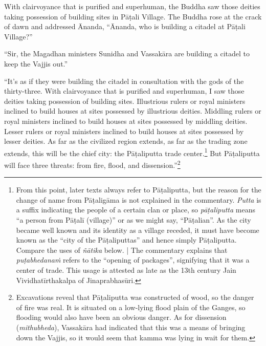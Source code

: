 \documentclass[12pt,openany]{book}%
\begin{document}
With clairvoyance that is purified and superhuman, the Buddha saw those deities taking possession of building sites in \textsanskrit{Pāṭali} Village. The Buddha rose at the crack of dawn and addressed Ānanda, “Ānanda, who is building a citadel at \textsanskrit{Pāṭali} Village?” 

“Sir, the Magadhan ministers Sunidha and \textsanskrit{Vassakāra} are building a citadel to keep the Vajjis out.” 

“It’s as if they were building the citadel in consultation with the gods of the thirty-three. With clairvoyance that is purified and superhuman, I saw those deities taking possession of building sites. Illustrious rulers or royal ministers inclined to build houses at sites possessed by illustrious deities. Middling rulers or royal ministers inclined to build houses at sites possessed by middling deities. Lesser rulers or royal ministers inclined to build houses at sites possessed by lesser deities. As far as the civilized region extends, as far as the trading zone extends, this will be the chief city: the \textsanskrit{Pāṭaliputta} trade center.\footnote{From this point, later texts always refer to \textsanskrit{Pāṭaliputta}, but the reason for the change of name from \textsanskrit{Pāṭaligāma} is not explained in the commentary. \textit{Putta} is a suffix indicating the people of a certain clan or place, so \textit{\textsanskrit{pāṭaliputta}} means “a person from \textsanskrit{Pāṭalī} (village)” or as we might say, “\textsanskrit{Pāṭalian}”. As the city became well known and its identity as a village receded, it must have become known as the “city of the \textsanskrit{Pāṭaliputtas}” and hence simply \textsanskrit{Pāṭaliputta}. Compare the uses of \textit{\textsanskrit{ñātika}} below. | The commentary explains that \textit{\textsanskrit{puṭabhedanaṁ}} refers to the “opening of packages”, signifying that it was a center of trade. This usage is attested as late as the 13th century Jain \textsanskrit{Vividhatīrthakalpa} of \textsanskrit{Jinaprabhasūri}. } But \textsanskrit{Pāṭaliputta} will face three threats: from fire, flood, and dissension.”\footnote{Excavations reveal that \textsanskrit{Pāṭaliputta} was constructed of wood, so the danger of fire was real. It is situated on a low-lying flood plain of the Ganges, so flooding would also have been an obvious danger. As for dissension (\textit{mithubheda}), \textsanskrit{Vassakāra} had indicated that this was a means of bringing down the Vajjis, so it would seem that kamma was lying in wait for them. } 
\end{document}
